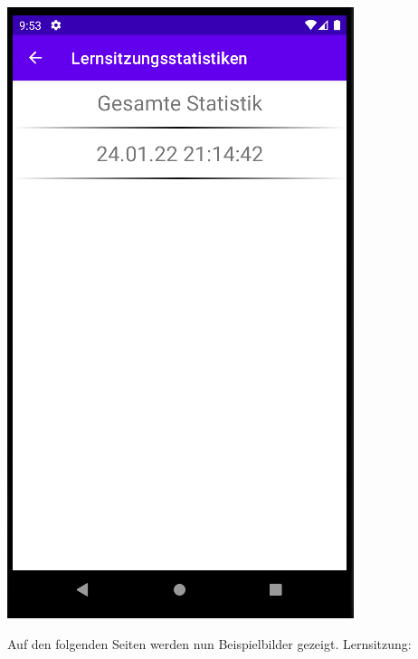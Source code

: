 \documentclass[ngerman]{tutorial}
\begin{document}
\begin{center}
    \includegraphics[scale=0.45]{stats_selectionLearn.png}
\end{center}
Auf den folgenden Seiten werden nun Beispielbilder gezeigt.
\newpage
\centering Lernsitzung:
\end{document}
